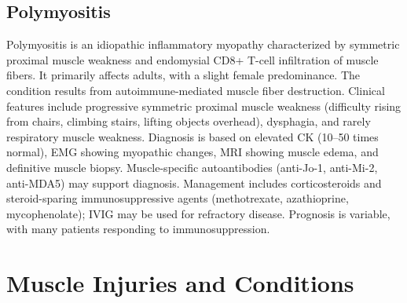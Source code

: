 \subsection{Polymyositis}
\label{sec:Polymyositis}
Polymyositis is an idiopathic inflammatory myopathy characterized by symmetric proximal muscle weakness and endomysial CD8+ T-cell infiltration of muscle fibers. It primarily affects adults, with a slight female predominance. The condition results from autoimmune-mediated muscle fiber destruction. Clinical features include progressive symmetric proximal muscle weakness (difficulty rising from chairs, climbing stairs, lifting objects overhead), dysphagia, and rarely respiratory muscle weakness. Diagnosis is based on elevated CK (10--50 times normal), EMG showing myopathic changes, MRI showing muscle edema, and definitive muscle biopsy. Muscle-specific autoantibodies (anti-Jo-1, anti-Mi-2, anti-MDA5) may support diagnosis. Management includes corticosteroids and steroid-sparing immunosuppressive agents (methotrexate, azathioprine, mycophenolate); IVIG may be used for refractory disease. Prognosis is variable, with many patients responding to immunosuppression.

\section{Muscle Injuries and Conditions}








\label{sec:Muscle Injuries and Conditions}

